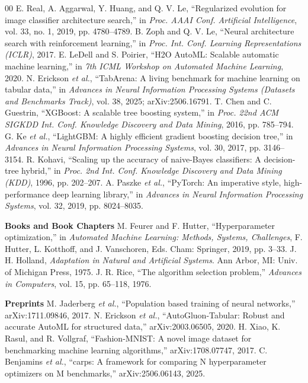 \documentclass[conference]{IEEEtran}
\begin{document}
\begin{thebibliography}{00}
 E. Real, A. Aggarwal, Y. Huang, and Q. V. Le, ``Regularized evolution for image classifier architecture search,'' in \textit{Proc. AAAI Conf. Artificial Intelligence}, vol. 33, no. 1, 2019, pp. 4780--4789.
 B. Zoph and Q. V. Le, ``Neural architecture search with reinforcement learning,'' in \textit{Proc. Int. Conf. Learning Representations (ICLR)}, 2017.
 E. LeDell and S. Poirier, ``H2O AutoML: Scalable automatic machine learning,'' in \textit{7th ICML Workshop on Automated Machine Learning}, 2020.
 N. Erickson \textit{et al.}, ``TabArena: A living benchmark for machine learning on tabular data,'' in \textit{Advances in Neural Information Processing Systems (Datasets and Benchmarks Track)}, vol. 38, 2025; arXiv:2506.16791.
 T. Chen and C. Guestrin, ``XGBoost: A scalable tree boosting system,'' in \textit{Proc. 22nd ACM SIGKDD Int. Conf. Knowledge Discovery and Data Mining}, 2016, pp. 785--794.
 G. Ke \textit{et al.}, ``LightGBM: A highly efficient gradient boosting decision tree,'' in \textit{Advances in Neural Information Processing Systems}, vol. 30, 2017, pp. 3146--3154.
 R. Kohavi, ``Scaling up the accuracy of naive-Bayes classifiers: A decision-tree hybrid,'' in \textit{Proc. 2nd Int. Conf. Knowledge Discovery and Data Mining (KDD)}, 1996, pp. 202--207.
 A. Paszke \textit{et al.}, ``PyTorch: An imperative style, high-performance deep learning library,'' in \textit{Advances in Neural Information Processing Systems}, vol. 32, 2019, pp. 8024--8035.
\item[] \textbf{Books and Book Chapters}
 M. Feurer and F. Hutter, ``Hyperparameter optimization,'' in \textit{Automated Machine Learning: Methods, Systems, Challenges}, F. Hutter, L. Kotthoff, and J. Vanschoren, Eds. Cham: Springer, 2019, pp. 3--33.
 J. H. Holland, \textit{Adaptation in Natural and Artificial Systems}. Ann Arbor, MI: Univ. of Michigan Press, 1975.
 J. R. Rice, ``The algorithm selection problem,'' \textit{Advances in Computers}, vol. 15, pp. 65--118, 1976.
\item[] \textbf{Preprints}
 M. Jaderberg \textit{et al.}, ``Population based training of neural networks,'' arXiv:1711.09846, 2017.
 N. Erickson \textit{et al.}, ``AutoGluon-Tabular: Robust and accurate AutoML for structured data,'' arXiv:2003.06505, 2020.
 H. Xiao, K. Rasul, and R. Vollgraf, ``Fashion-MNIST: A novel image dataset for benchmarking machine learning algorithms,'' arXiv:1708.07747, 2017.
 C. Benjamins \textit{et al.}, ``carps: A framework for comparing N hyperparameter optimizers on M benchmarks,'' arXiv:2506.06143, 2025.
\end{thebibliography}
\end{document}
